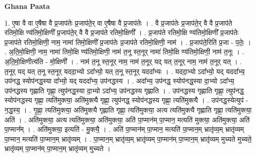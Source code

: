 \documentclass[17pt]{extarticle}
\begin{document}
\textbf{Ghana Paata } \newline

1. ए॒षा वै वा ए॒षैषा वै प्र॒जाप॑तेः प्र॒जाप॑ते॒र् वा ए॒षैषा वै प्र॒जाप॑तेः । . वै प्र॒जाप॑तेः प्र॒जाप॑ते॒र् वै वै प्र॒जाप॑ते रतिमो॒क्षि ण्य॑तिमो॒क्षिणी᳚ प्र॒जाप॑ते॒र् वै वै प्र॒जाप॑ते रतिमो॒क्षिणी᳚ । . प्र॒जाप॑ते रतिमो॒क्षि ण्य॑तिमो॒क्षिणी᳚ प्र॒जाप॑तेः प्र॒जाप॑ते रतिमो॒क्षिणी॒ नाम॒ नामा॑ तिमो॒क्षिणी᳚ प्र॒जाप॑तेः प्र॒जाप॑ते रतिमो॒क्षिणी॒ नाम॑ । . प्र॒जाप॑ते॒रिति॑ प्र॒जा - प॒तेः॒ । . अ॒ति॒मो॒क्षिणी॒ नाम॒ नामा॑ तिमो॒क्षि ण्य॑तिमो॒क्षिणी॒ नाम॑ त॒नू स्त॒नूर् नामा॑ तिमो॒क्षि ण्य॑तिमो॒क्षिणी॒ नाम॑ त॒नूः । . अ॒ति॒मो॒क्षिणीत्य॑ति - मो॒क्षिणी᳚ । . नाम॑ त॒नू स्त॒नूर् नाम॒ नाम॑ त॒नूर् यद् यत् त॒नूर् नाम॒ नाम॑ त॒नूर् यत् । . त॒नूर् यद् यत् त॒नू स्त॒नूर् यददा॒भ्यो ऽदा᳚भ्यो॒ यत् त॒नू स्त॒नूर् यददा᳚भ्यः । . यददा॒भ्यो ऽदा᳚भ्यो॒ यद् यददा᳚भ्य॒ उप॑नद्ध॒ स्योप॑नद्ध॒स्या दा᳚भ्यो॒ यद् यददा᳚भ्य॒ उप॑नद्धस्य । . अदा᳚भ्य॒ उप॑नद्ध॒ स्योप॑नद्ध॒स्या दा॒भ्यो ऽदा᳚भ्य॒ उप॑नद्धस्य गृह्णाति गृह्णा॒ त्युप॑नद्ध॒स्या दा॒भ्यो ऽदा᳚भ्य॒ उप॑नद्धस्य गृह्णाति । . उप॑नद्धस्य गृह्णाति गृह्णा॒ त्युप॑नद्ध॒ स्योप॑नद्धस्य गृह्णा॒ त्यति॑मुक्त्या॒ अति॑मुक्त्यै गृह्णा॒ त्युप॑नद्ध॒ स्योप॑नद्धस्य गृह्णा॒ त्यति॑मुक्त्यै । . उप॑नद्ध॒स्येत्युप॑ - न॒द्ध॒स्य॒ । . गृ॒ह्णा॒ त्यति॑मुक्त्या॒ अति॑मुक्त्यै गृह्णाति गृह्णा॒ त्यति॑मुक्त्या॒ अत्य त्यति॑मुक्त्यै गृह्णाति गृह्णा॒ त्यति॑मुक्त्या॒ अति॑ । . अति॑मुक्त्या॒ अत्य त्यति॑मुक्त्या॒ अति॑मुक्त्या॒ अति॑ पा॒प्मान॑म् पा॒प्मान॒ मत्यति॑ मुक्त्या॒ अति॑मुक्त्या॒ अति॑ पा॒प्मान᳚म् । . अति॑मुक्त्या॒ इत्यति॑ - मु॒क्त्यै॒ । . अति॑ पा॒प्मान॑म् पा॒प्मान॒ मत्यति॑ पा॒प्मान॒म् भ्रातृ॑व्य॒म् भ्रातृ॑व्यम् पा॒प्मान॒ मत्यति॑ पा॒प्मान॒म् भ्रातृ॑व्यम् । . पा॒प्मान॒म् भ्रातृ॑व्य॒म् भ्रातृ॑व्यम् पा॒प्मान॑म् पा॒प्मान॒म् भ्रातृ॑व्यम् मुच्यते मुच्यते॒ भ्रातृ॑व्यम् पा॒प्मान॑म् पा॒प्मान॒म् भ्रातृ॑व्यम् मुच्यते । \newline
\end{document}
